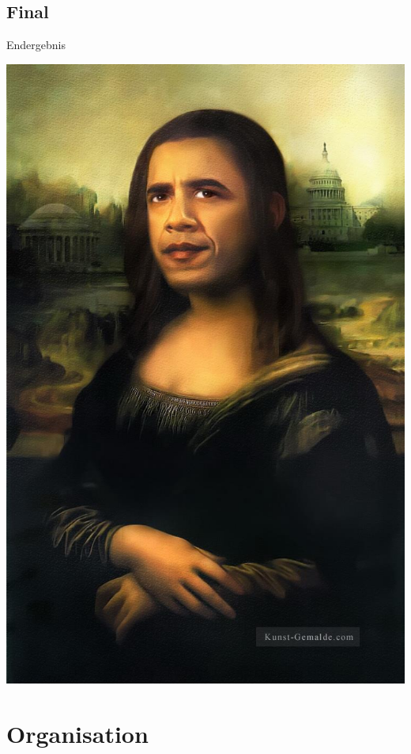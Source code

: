 \documentclass[19pt]{beamer}
\begin{document}
\subsection{Final}
\begin{frame}{Endergebnis}
\begin{center}
\includegraphics[scale=0.2]{resources/final.jpg}
\end{center}
\end{frame}

\section{Organisation}
\end{document}
